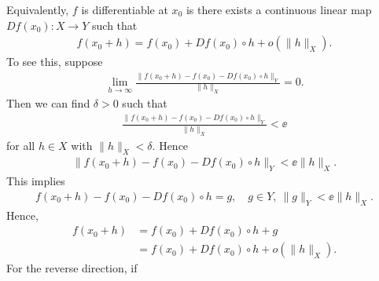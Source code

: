   \begin{framed}
  \begin{remark}
    Equivalently, $f$ is differentiable at $x_{0}$ is there exists a continuous
    linear map $Df(x_{0}): X \to Y$ such that
    \begin{equation*}
    \begin{split}
      f(x_{0} + h) = f(x_{0}) + Df(x_{0}) \circ h + o(\| h \|_{X}).
    \end{split}
    \end{equation*}
    To see this, suppose
    \begin{equation*}
    \begin{split}
      \lim_{h \to \infty} \frac{\| f(x_{0} + h) - f(x_{0}) - Df(x_{0}) \circ h
      \|_{Y}}{\| h \|_{X}} = 0.
    \end{split}
    \end{equation*}
    Then we can find $\delta > 0$ such that
    \begin{equation*}
    \begin{split}
    \frac{\| f(x_{0} + h) - f(x_{0}) - Df(x_{0}) \circ h
      \|_{Y}}{\| h \|_{X}}  < \ee
    \end{split}
    \end{equation*}
    for all $h \in X$ with $\| h \|_{X} < \delta$. Hence
    \begin{equation*}
    \begin{split}
      \| f(x_{0} + h) - f(x_{0}) - Df(x_{0}) \circ h \|_{Y} < \ee \| h
      \|_{X}.
    \end{split}
    \end{equation*}
    This implies
    \begin{equation*}
    \begin{split}
      f(x_{0} + h) - f(x_{0}) - Df(x_{0}) \circ h = g, \quad g \in Y, \ \| g
      \|_{Y} < \ee \| h \|_{X}.
    \end{split}
    \end{equation*}
    Hence, 
    \begin{equation*}
    \begin{split}
      f(x_{0} + h) 
      & = f(x_{0}) + Df(x_{0}) \circ h + g
      \\
      & =  f(x_{0}) + Df(x_{0})\circ h + o(\| h \|_{X}).
    \end{split}
    \end{equation*}
    For the reverse direction, if

\end{remark}
\end{framed}
